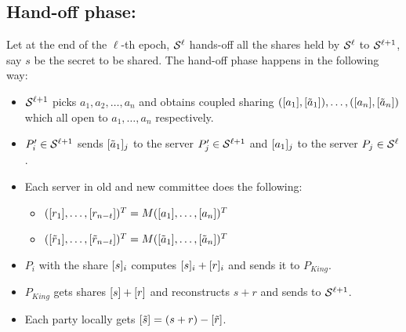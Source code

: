 \subsection{Hand-off phase: } Let at the end of the $\ell$-th epoch, $\mathcal{S}^{\ell}$ hands-off all the shares held by $\mathcal{S}^{\ell}$ to $\mathcal{S}^{\ell+1}$, say $s$ be the secret to be shared. The hand-off phase happens in the following way:
\begin{itemize}
	\item $\mathcal{S}^{\ell+1}$ picks $a_1, a_2, \ldots, a_n$ and obtains coupled sharing $([a_1], [\tilde{a}_1]), \ldots, ([a_n], [\tilde{a}_n])$ which all open to $a_1, \ldots, a_n$ respectively. 
	
	\item $P'_i\in \mathcal{S}^{\ell+1}$ sends $[\tilde{a}_1]_j$ to the server $P'_j\in \mathcal{S}^{\ell+1}$ and $[a_1]_j$ to the server $P_j\in\mathcal{S}^{\ell}$.
	
	\item Each server in old and new committee does the following: 
	\begin{itemize}
		\item $([r_1], \ldots, [r_{n-t}])^T = M([a_1], \ldots, [a_n])^T$
		\item $([\tilde{r}_1], \ldots, [\tilde{r}_{n-t}])^T = M([\tilde{a}_1], \ldots, [\tilde{a}_n])^T$
	\end{itemize}
	
	\item $P_i$ with the share $[s]_i$ computes $[s]_i+[r]_i$ and sends it to $P_{King}$.
	
	\item $P_{King}$ gets shares $[s]+[r]$ and reconstructs $s+r$ and sends to $\mathcal{S}^{\ell+1}$.
	
	\item Each party locally gets $[\tilde{s}] = (s+r)-[\tilde{r}]$.
\end{itemize}
